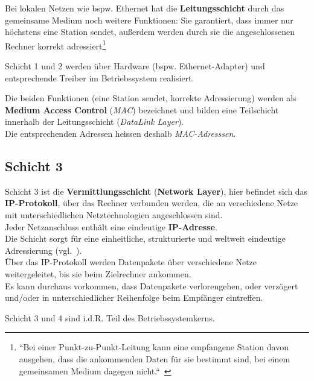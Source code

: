 \noindent
Bei lokalen Netzen wie {bspw.} Ethernet hat die \textbf{Leitungsschicht} durch das gemeinsame Medium noch weitere Funktionen: Sie garantiert, dass immer nur höchstens eine Station sendet, außerdem werden durch sie die angeschlossenen Rechner korrekt adressiert\footnote{
``Bei einer Punkt-zu-Punkt-Leitung kann eine empfangene Station davon ausgehen, dass die ankommenden Daten für sie bestimmt sind, bei einem gemeinsamen Medium dagegen nicht.``~\cite[257]{Oec22}
}

\begin{tcolorbox}
    Schicht 1 und 2 werden über Hardware ({bspw.} Ethernet-Adapter) und entsprechende Treiber im Betriebssystem realisiert.
\end{tcolorbox}

\noindent
Die beiden Funktionen (eine Station sendet, korrekte Adressierung) werden als \textbf{Medium Access Control} (\textit{MAC}) bezeichnet und bilden eine Teilschicht innerhalb der Leitungsschicht (\textit{DataLink Layer}).\\
Die entsprechenden Adressen heissen deshalb \textit{MAC-Adresssen}.

\subsection*{Schicht 3}
Schicht 3 ist die \textbf{Vermittlungsschicht} (\textbf{Network Layer}), hier befindet sich das \textbf{IP-Protokoll}, über das Rechner verbunden werden, die an verschiedene Netze mit unterschiedlichen Netztechnologien angeschlossen sind.\\

\noindent
Jeder Netzanschluss enthält eine eindeutige \textbf{IP-Adresse}.\\
Die Schicht sorgt für eine einheitliche, strukturierte und weltweit eindeutige Adressierung (vgl.~\cite[258]{Oec22}).\\

\noindent
Über das IP-Protokoll werden Datenpakete über verschiedene Netze weitergeleitet, bis sie beim Zielrechner ankommen.\\

\noindent
Es kann durchaus vorkommen, dass Datenpakete verlorengehen, oder verzögert und/oder in unterschiedlicher Reihenfolge beim Empfänger eintreffen.


\begin{tcolorbox}
    Schicht 3 und 4 sind i.d.R. Teil des Betriebssystemkerns.
\end{tcolorbox}

